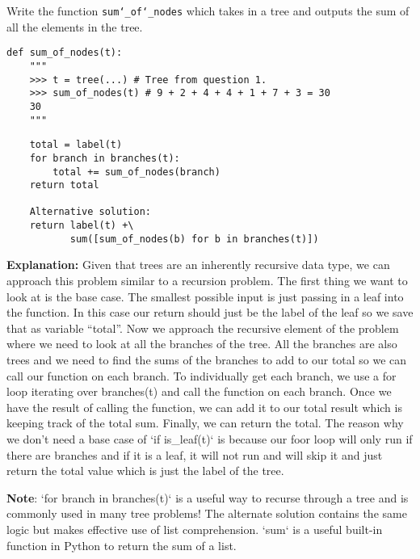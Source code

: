 \begin{blocksection}
\question Write the function \texttt{sum\char`_of\char`_nodes} which takes in a
tree and outputs the sum of all the elements in the tree.
\end{blocksection}

\begin{lstlisting}
def sum_of_nodes(t):
    """
    >>> t = tree(...) # Tree from question 1.
    >>> sum_of_nodes(t) # 9 + 2 + 4 + 4 + 1 + 7 + 3 = 30
    30
    """
\end{lstlisting}
\begin{solution}
\begin{lstlisting}
    total = label(t)
    for branch in branches(t):
        total += sum_of_nodes(branch)
    return total

    Alternative solution:
    return label(t) +\
           sum([sum_of_nodes(b) for b in branches(t)])
\end{lstlisting}
\textbf{Explanation:}
Given that trees are an inherently recursive data type, we can approach this problem similar to a recursion problem. The first thing we want to look at is the base case. The smallest possible input is just passing in a leaf into the function. In this case our return should just be the label of the leaf so we save that as variable “total”. Now we approach the recursive element of the problem where we need to look at all the branches of the tree. All the branches are also trees and we need to find the sums of the branches to add to our total so we can call our function on each branch. To individually get each branch, we use a for loop iterating over branches(t) and call the function on each branch. Once we have the result of calling the function, we can add it to our total result which is keeping track of the total sum. Finally, we can return the total. The reason why we don’t need a base case of `if is\_leaf(t)` is because our foor loop will only run if there are branches and if it is a leaf, it will not run and will skip it and just return the total value which is just the label of the tree. 

\textbf{Note}: `for branch in branches(t)` is a useful way to recurse through a tree and is commonly used in many tree problems!
The alternate solution contains the same logic but makes effective use of list comprehension. `sum` is a useful built-in function in Python to return the sum of a list.

\end{solution}